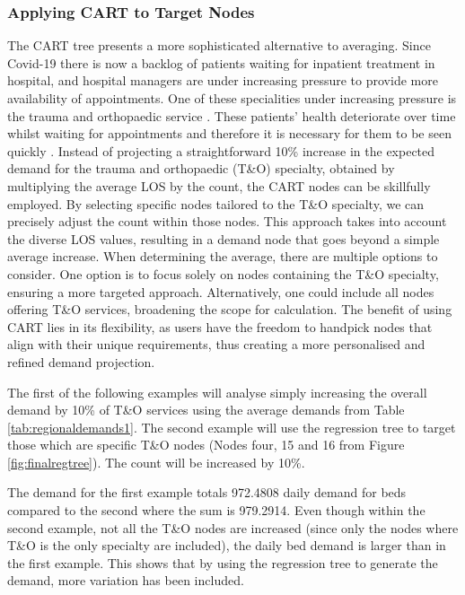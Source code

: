\documentclass[../thesis.tex]{subfiles}
\begin{document}
\subsubsection{Applying CART to Target Nodes}
The CART tree presents a more sophisticated alternative to averaging. Since Covid-19 there is now a backlog of patients waiting for inpatient treatment in hospital, and hospital managers are under increasing pressure to provide more availability of appointments. One of these specialities under increasing pressure is the trauma and orthopaedic service \cite{Clement2021}. These patients' health deteriorate over time whilst waiting for appointments and therefore it is necessary for them to be seen quickly \cite{Robling2009}. Instead of projecting a straightforward 10\% increase in the expected demand for the trauma and orthopaedic (T\&O) specialty, obtained by multiplying the average LOS by the count, the CART nodes can be skillfully employed. By selecting specific nodes tailored to the T\&O specialty, we can precisely adjust the count within those nodes. This approach takes into account the diverse LOS values, resulting in a demand node that goes beyond a simple average increase. When determining the average, there are multiple options to consider. One option is to focus solely on nodes containing the T\&O specialty, ensuring a more targeted approach. Alternatively, one could include all nodes offering T\&O services, broadening the scope for calculation. The benefit of using CART lies in its flexibility, as users have the freedom to handpick nodes that align with their unique requirements, thus creating a more personalised and refined demand projection.

The first of the following examples will analyse simply increasing the overall demand by 10\% of T\&O services using the average demands from Table \ref{tab:regionaldemands1}. The second example will use the regression tree to target those which are specific T\&O nodes (Nodes four, 15 and 16 from Figure \ref{fig:finalregtree}). The count will be increased by 10\%.

The demand for the first example totals 972.4808 daily demand for beds compared to the second where the sum is 979.2914. Even though within the second example, not all the T\&O nodes are increased (since only the nodes where T\&O is the only specialty are included), the daily bed demand is larger than in the first example. This shows that by using the regression tree to generate the demand, more variation has been included.
\end{document}
